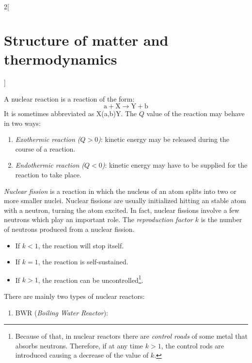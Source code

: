\documentclass[../../../main.tex]{subfiles}
\begin{document}
\begin{multicols}{2}[\section{Structure of matter and thermodynamics}]
\begin{prop}
\begin{enumerate}
        \end{enumerate}
    \end{prop}
    \begin{definition}
        A nuclear reaction is a reaction of the form:
        $$\text{a}+\text{X}\rightarrow\text{Y}+\text{b}$$
        It is sometimes abbreviated as X(a,b)Y. The $Q$ value of the reaction may behave in two ways:
        \begin{enumerate}
            \item \textit{Exothermic reaction ($Q>0$)}: kinetic energy may be released during the course of a reaction.
            \item \textit{Endothermic reaction ($Q<0$)}: kinetic energy may have to be supplied for the reaction to take place.
        \end{enumerate}
    \end{definition}
    \begin{definition}
        \textit{Nuclear fission} is a reaction in which the nucleus of an atom splits into two or more smaller nuclei. Nuclear fissions are usually initialized hitting an stable atom with a neutron, turning the atom excited. In fact, nuclear fissions involve a few neutrons which play an important role. The \textit{reproduction factor $k$} is the number of neutrons produced from a nuclear fission.
        \begin{itemize}
            \item If $k<1$, the reaction will stop itself.
            \item If $k=1$, the reaction is self-sustained.
            \item If $k>1$, the reaction can be uncontrolled\footnote{Because of that, in nuclear reactors there are \textit{control roads} of some metal that absorbs neutrons. Therefore, if at any time $k>1$, the control rods are introduced causing a decrease of the value of $k$.}.
        \end{itemize}
    \end{definition}
    \begin{definition}
        There are mainly two types of nuclear reactors:
        \begin{enumerate}
            \item BWR (\textit{Boiling Water Reactor}):
                  \begin{center}
                      \begin{minipage}{\linewidth}
                          \centering

\end{minipage}
\end{center}
\end{enumerate}
\end{definition}
\end{multicols}
\end{document}
